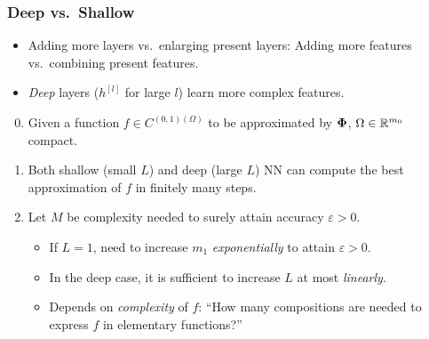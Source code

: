 \documentclass[10pt,hyperref={pdfpagelabels=false}]{beamer}
\begin{document}
\begin{frame}
    \frametitle{Deep vs.~Shallow}
    \begin{itemize}
        \item Adding more layers vs.~enlarging present layers: Adding more features vs.~combining present features.
        \item \emph{Deep} layers ($h^{[l]}$ for large $l$) learn more complex features.
    \end{itemize}
    \begin{theorem}
        \begin{enumerate}
            \setcounter{enumi}{-1}
            \item Given a function $f\in C^{(0,1)(\Omega)}$ to be approximated by $\boldsymbol{\Phi}$, $\Omega\in\mathbb{R}^{m_0}$ compact.
            \item Both shallow (small $L$) and deep (large $L$) NN can compute the best approximation of $f$ in finitely many steps.
            \item Let $M$ be complexity needed to surely attain accuracy $\varepsilon>0$.
                \begin{itemize}
                    \item If $L=1$, need to increase $m_1$ \emph{exponentially} to attain $\varepsilon>0$.
                    \item In the deep case, it is sufficient to increase $L$ at most \emph{linearly}.
                    \item Depends on \emph{complexity} of $f$: ``How many compositions are needed to express $f$ in elementary functions?''
                \end{itemize}
        \end{enumerate}
    \end{theorem}
\end{frame}
\end{document}
